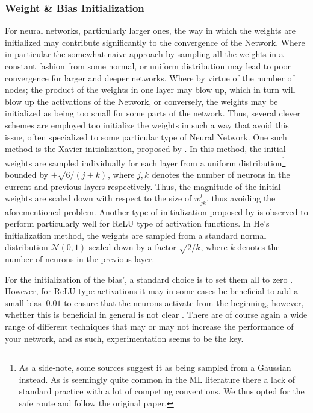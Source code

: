 \documentclass[reprint, english, nofootinbib]{revtex4-2}
\begin{document}
\subsubsection{Weight \& Bias Initialization}
\noindent
For neural networks, particularly larger ones, the way in which the weights are initialized may contribute significantly to the convergence of the Network. Where in particular the somewhat naive approach by sampling all the weights in a constant fashion from some normal, or uniform distribution may lead to poor convergence for larger and deeper networks. Where by virtue of the number of nodes; the product of the weights in one layer may blow up, which in turn will blow up the activations of the Network, or conversely, the weights may be initialized as being too small for some parts of the network. Thus, several clever schemes are employed too initialize the weights in such a way that avoid this issue, often specialized to some particular type of Neural Network. One such method is the Xavier initialization, proposed by \textcite{xavier}. In this method, the initial weights are sampled individually for each layer from a uniform distribution\footnote{As a side-note, some sources suggest it as being sampled from a Gaussian instead. As is seemingly quite common in the ML literature there a lack of standard practice with a lot of competing conventions. We thus opted for the safe route and follow the original paper.} bounded by $\pm \sqrt{6/(j + k)}$, where $j, k$ denotes the number of neurons in the current and previous layers respectively. Thus, the magnitude of the initial weights are scaled down with respect to the size of $w^l_{jk}$, thus avoiding the aforementioned problem. Another type of initialization proposed by \textcite{he2015delving} is observed to perform particularly well for ReLU type of activation functions. In He's initialization method, the weights are sampled from a standard normal distribution $\mathcal N(0, 1)$ scaled down by a factor $\sqrt{2/k}$, where $k$ denotes the number of neurons in the previous layer.

For the initialization of the bias', a standard choice is to set them all to zero \textcite{Aggarwall}. However, for ReLU type activations it may in some cases be beneficial to add a small bias $~0.01$ to ensure that the neurons activate from the beginning, however, whether this is beneficial in general is not clear \cite{CS231n}. There are of course again a wide range of different techniques that may or may not increase the performance of your network, and as such, experimentation seems to be the key.
\end{document}
